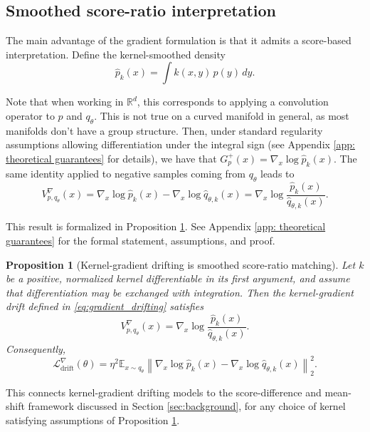 \documentclass{article}
\theoremstyle{plain}
\newtheorem{proposition}[theorem]{Proposition}
\begin{document}
\subsection{Smoothed score-ratio interpretation}

The main advantage of the gradient formulation is that it admits a score-based interpretation. Define the kernel-smoothed density
\[\label{eq:smoothed_density}
\widehat{p}_k(x)
= \int k(x,y)\,p(y)\,dy.\]

Note that when working in $\mathbb{R}^d$, this corresponds to applying a convolution operator to $p$ and $q_\theta$. This is not true on a curved manifold in general, as most  manifolds don't have a group structure. Then, under standard  regularity assumptions allowing differentiation under the
integral sign (see Appendix \ref{app: theoretical guarantees} for details), we have that $ G_{p}^+(x) = \nabla_x \log \widehat{p}_k(x).$ 
The same identity applied to negative samples coming from \(q_\theta\) leads to
\[
V^\nabla_{p,q_\theta}(x)
=
\nabla_x \log \widehat{p}_k(x)
-
\nabla_x \log \widehat{q}_{\theta,k}(x)
=
\nabla_x \log
\frac{\widehat{p}_k(x)}
     {\widehat{q}_{\theta,k}(x)}.
\]

This result is formalized in Proposition \ref{prop:score_ratio_matching}. See Appendix \ref{app: theoretical guarantees} for the formal statement, assumptions, and proof.



\begin{tcolorbox}[
    colback=blue!5,
    colframe=blue!5,
    boxrule=0pt,
    arc=2mm,
    left=2mm,
    right=2mm,
    top=2mm,
    bottom=2mm
]
\begin{proposition}[Kernel-gradient drifting is smoothed score-ratio matching]
\label{prop:score_ratio_matching}
Let \(k\) be a positive, normalized kernel differentiable in its first argument, and assume that
differentiation may be exchanged with integration. Then the kernel-gradient drift
defined in \eqref{eq:gradient_drifting} satisfies
\[
V^\nabla_{p,q_\theta}(x)
=
\nabla_x \log
\frac{\widehat{p}_k(x)}
     {\widehat{q}_{\theta,k}(x)}.
\]
Consequently,
\[
\mathcal{L}^{\nabla}_\mathrm{drift}(\theta)
=
\eta^2
\mathbb{E}_{x\sim q_\theta}
\left\|
\nabla_x \log \widehat{p}_k(x)
-
\nabla_x \log \widehat{q}_{\theta,k}(x)
\right\|_2^2.
\]
\end{proposition}
\end{tcolorbox}


This connects kernel-gradient drifting models to the score-difference and mean-shift framework discussed in Section \ref{sec:background}, for any choice of kernel satisfying assumptions of Proposition \ref{prop:score_ratio_matching}.
\end{document}
